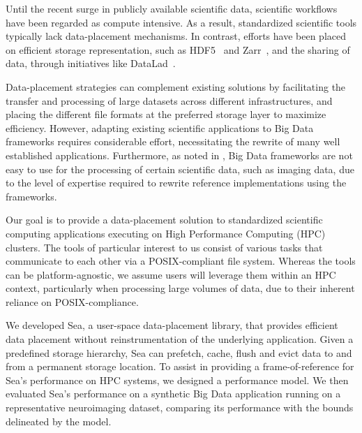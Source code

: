 \documentclass[10pt,journal,compsoc]{IEEEtran}
\begin{document}
Until the recent surge in publicly available scientific data, scientific
workflows have been regarded as compute intensive. As a result, standardized
scientific tools typically lack data-placement mechanisms. In contrast, efforts
have been placed on efficient storage representation, such as HDF5~\cite{hdf5}
and Zarr~\cite{zarr}, and the sharing of data, through initiatives like
DataLad~\cite{wagner2022fairly}.

Data-placement strategies can complement existing solutions by facilitating the
transfer and processing of large datasets across different infrastructures, and
placing the different file formats at the preferred storage layer to maximize
efficiency. However, adapting existing scientific applications to Big Data
frameworks requires considerable effort, necessitating the rewrite of many well
established applications. Furthermore, as noted in \cite{mehta2017comparative},
Big Data frameworks are not easy to use for the processing of certain scientific
data, such as imaging data, due to the level of expertise required to rewrite
reference implementations using the frameworks.






Our goal is to provide a data-placement solution to standardized scientific
computing applications executing on High Performance Computing (HPC) clusters.
The tools of particular interest to us consist of various tasks that communicate
to each other via a POSIX-compliant file system. Whereas the tools can be
platform-agnostic, we assume users will leverage them within an HPC context,
particularly when processing large volumes of data, due to their inherent
reliance on POSIX-compliance.

We developed Sea, a user-space data-placement library, that provides efficient
data placement without reinstrumentation of the underlying application. Given a
predefined storage hierarchy, Sea can prefetch, cache, flush and evict data to
and from a permanent storage location. To assist in providing a
frame-of-reference for Sea's performance on HPC systems, we designed a
performance model. We then evaluated Sea's performance on a synthetic Big Data
application running on a representative neuroimaging dataset, comparing its
performance with the bounds delineated by the model.
\end{document}
